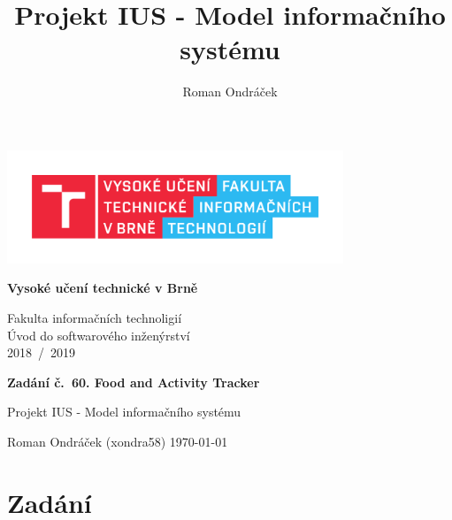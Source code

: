 \documentclass[12pt,a4paper]{article}
\author{Roman Ondráček}
\title{Projekt IUS - Model informačního systému}
\begin{document}
\pagestyle{empty}

\begin{center}

\includegraphics[height = 96pt]{img/FIT_barevne_CMYK_CZ.pdf} \\

\begin{LARGE}
\textbf{Vysoké učení technické v Brně} \\
\end{LARGE}

\begin{large}
Fakulta informačních technoligií \\
Úvod do softwarového inženýrství \\
2018~/~2019 \\
\end{large}

\vspace{128pt}

\begin{huge}
\textbf{Zadání č.~60. Food and Activity Tracker} \\
\end{huge}

\begin{large}
Projekt IUS - Model informačního systému \\
\end{large}

\end{center}

\vfill

Roman Ondráček (xondra58) \hfill \today

\pagestyle{plain}

\newpage

\section*{Zadání}
\end{document}
